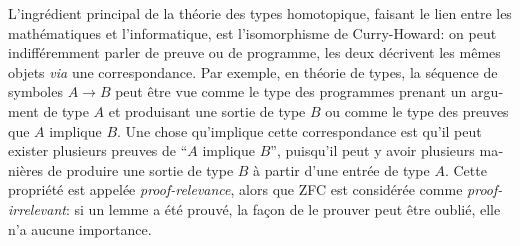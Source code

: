 \begin{otherlanguage}{french}
L'ingrédient principal de la théorie des types homotopique, faisant le
lien entre les mathématiques et l'informatique, est l'isomorphisme de
Curry-Howard: on peut indifféremment parler de preuve ou de programme,
les deux décrivent les mêmes objets {\em via} une correspondance. Par
exemple, en théorie de types, la séquence de symboles $A\to B$ peut
être vue comme le type des programmes prenant un argument de type $A$
et produisant une sortie de type $B$ ou comme le type des preuves que
$A$ implique $B$. Une chose qu'implique cette correspondance est qu'il
peut exister plusieurs preuves de ``$A$ implique $B$'', puisqu'il peut
y avoir plusieurs manières de produire une sortie de type $B$ à partir
d'une entrée de type $A$. Cette propriété est appelée {\em
  proof-relevance}, alors que ZFC est considérée comme {\em
  proof-irrelevant}: si un lemme a été prouvé, la façon de le prouver
peut être oublié, elle n'a aucune importance.


\end{otherlanguage}
